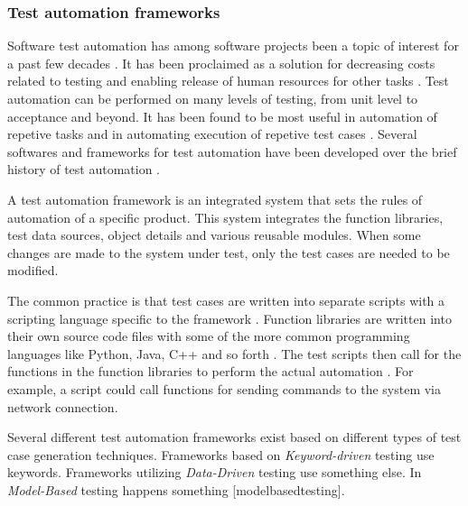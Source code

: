 \documentclass[english,12pt,a4paper,pdftex,elec,utf8]{aaltothesis}
\begin{document}
\subsubsection{Test automation frameworks}
Software test automation has among software projects been a topic of interest for a past few decades \cite{testautomationconf2013}. It has been proclaimed as a solution for decreasing costs related to testing and enabling release of human resources for other tasks \cite{workshopontestautomation, kasurinentesting}. Test automation can be performed on many levels of testing, from unit level to acceptance and beyond. It has been found to be most useful in automation of repetive tasks and in automating execution of repetive test cases \cite{kasurinentesting}. Several softwares and frameworks for test automation have been developed over the brief history of test automation \cite{testautomationconf2013, kasurinentesting}. \par 
A test automation framework is an integrated system that sets the rules of automation of a specific product. This system integrates the function libraries, test data sources, object details and various reusable modules. When some changes are made to the system under test, only the test cases are needed to be modified. \cite{exploringuseofta} \par
The common practice is that test cases are written into separate scripts with a scripting language specific to the framework \cite{exploringuseofta, robotmain}. Function libraries are written into their own source code files with some of the more common programming languages like Python, Java, C++ and so forth \cite{robotmain, modelbasedtesting}.
The test scripts then call for the functions in the function libraries to perform the actual automation \cite{modelbasedtesting}. For example, a script could call functions for sending commands to the system via network connection.\par 
Several different test automation frameworks exist based on different types of test case generation techniques. Frameworks based on \textit{Keyword-driven} testing use keywords. Frameworks utilizing \textit{Data-Driven} testing use something else. In \textit{Model-Based} testing happens something [modelbasedtesting].\par
\end{document}
